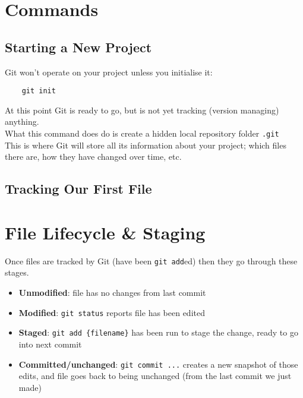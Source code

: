 \section{Commands}

\subsection{Starting a New Project}

Git won't operate on your project unless you initialise it:

\begin{verbatim}
    git init
\end{verbatim}

At this point Git is ready to go, but is not yet tracking (version managing) anything.
\\

What this command does do is create a hidden local repository folder \texttt{.git}
\\

This is where Git will store all its information about your project; which files there are, how they have changed over time, etc.

\subsection{Tracking Our First File}

\section{File Lifecycle \& Staging}

Once files are tracked by Git (have been \texttt{git add}ed) then they go through these stages.

\begin{itemize}
    \item \textbf{Unmodified}: file has no changes from last commit
    \item \textbf{Modified}: \texttt{git status} reports file has been edited
    \item \textbf{Staged}: \texttt{git add \{filename\}} has been run to stage the change, ready to go into next commit
    \item \textbf{Committed/unchanged}: \texttt{git commit ...} creates a new snapshot of those edits, and file goes back to being unchanged (from the last commit we just made)
\end{itemize}

